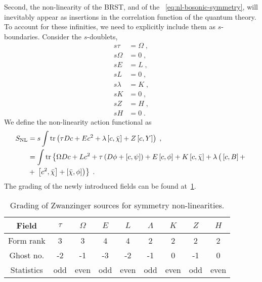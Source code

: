 \documentclass[../main.tex]{subfiles}
\begin{document}
Second, the non-linearity of the BRST, and of the ~\eqref{eq:nl-bosonic-symmetry}, will inevitably appear as insertions in the correlation function of the quantum theory. To account for these infinities, we need to explicitly include them as $ s $-boundaries. Consider the $ s $-doublets,
\begin{subequations}%
  \label{eq:nl-s-doublets}
  \begin{align}
    s\tau    & = \Omega \;, \\
    s\Omega  & = 0 \;,      \\
    sE       & = L \;,      \\
    sL       & = 0 \;,      \\
    s\lambda & = K \;,      \\
    sK       & = 0 \;,      \\
    sZ       & = H \;,      \\
    sH       & = 0 \;.
    \;
  \end{align}
\end{subequations}
We define the non-linearity action functional as
\begin{subequations}%
  \label{eq:nl-action}
  \begin{align}
    S_{\text{NL}} & = s \int \operatorname{tr} \left( \tau Dc + E c^2 + \lambda \left[ c,\bar\chi \right] + Z \left[ c,Y \right] \right) \;, \label{eq:nl-action-1}                                                                                           \\
                  & = \int \operatorname{tr} \left\{ \Omega Dc + Lc^2 + \tau \left( D\phi + \left[ c,\psi \right] \right) + E \left[ c,\phi \right] + K \left[ c,\bar\chi \right] + \lambda \left(\vphantom{^2}\left[ c,B \right] + \right. \right. \nonumber \\
                  & + \left. \left. \left[ c^2,\bar\chi \right] + \left[ \bar\chi,\phi \right] \right) \right\} \;.
  \end{align}
\end{subequations}
The grading of the newly introduced fields can be found at~\ref{tab:nl-sources}.

\begin{table}[htpb]
  \caption{Grading of Zwanzinger sources for symmetry non-linearities.}%
  \label{tab:nl-sources}
  \begin{tabular}{ccccccccc}
    \toprule
    Field      & $\tau$ & $\Omega$ & $E$ & $L$  & $\Lambda$ & $K$  & $Z$ & $H$  \\
    \midrule
    Form rank  & 3      & 3        & 4   & 4    & 2         & 2    & 2   & 2    \\
    Ghost no.  & -2     & -1       & -3  & -2   & -1        & 0    & -1  & 0    \\
    Statistics & odd    & even     & odd & even & odd       & even & odd & even \\
    \bottomrule
  \end{tabular}
\end{table}
\end{document}
